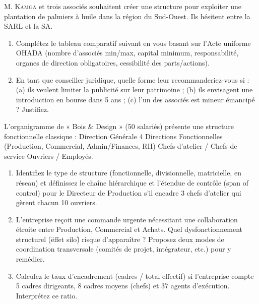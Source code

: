 \documentclass[11pt]{article}
\newcommand{\cle}[1]{{\popxbold\color{popdark}#1}}
\newcounter{popsec}
\newcounter{popsub}
\newcommand{\courssub}[1]{%
  \stepcounter{popsub}%
  \par\vspace{9pt}\noindent{\popxbold\fontsize{11.5}{13}\selectfont\color{popink}{\color{poporange}\thepopsec.\thepopsub}\hspace{6pt}#1}\par\nopagebreak\vspace{4pt}
}
\begin{document}
\courssub{Je m'entraîne}

\begin{exercice}
M. \textsc{Kamga} et trois associés souhaitent créer une structure pour exploiter une plantation de palmiers à huile dans la région du Sud-Ouest. Ils hésitent entre la SARL et la SA.
\begin{enumerate}
    \item Complétez le tableau comparatif suivant en vous basant sur l'Acte uniforme OHADA (nombre d'associés min/max, capital minimum, responsabilité, organes de direction obligatoires, cessibilité des parts/actions).
    \item En tant que conseiller juridique, quelle forme leur recommanderiez-vous si : (a) ils veulent limiter la publicité sur leur patrimoine ; (b) ils envisagent une introduction en bourse dans 5 ans ; (c) l'un des associés est mineur émancipé ? Justifiez.
\end{enumerate}
\end{exercice}

\begin{exercice}
L'organigramme de « Bois \& Design » (50 salariés) présente une structure fonctionnelle classique : Direction Générale \textrightarrow{} 4 Directions Fonctionnelles (Production, Commercial, Admin/Finances, RH) \textrightarrow{} Chefs d'atelier / Chefs de service \textrightarrow{} Ouvriers / Employés.
\begin{enumerate}
    \item Identifiez le type de structure (fonctionnelle, divisionnelle, matricielle, en réseau) et définissez le \cle{chaîne hiérarchique} et l'\cle{étendue de contrôle} (span of control) pour le Directeur de Production s'il encadre 3 chefs d'atelier qui gèrent chacun 10 ouvriers.
    \item L'entreprise reçoit une commande urgente nécessitant une collaboration étroite entre Production, Commercial et Achats. Quel dysfonctionnement structurel (\"effet silo\") risque d'apparaître ? Proposez deux modes de coordination transversale (comités de projet, intégrateur, etc.) pour y remédier.
    \item Calculez le \cle{taux d'encadrement} (cadres / total effectif) si l'entreprise compte 5 cadres dirigeants, 8 cadres moyens (chefs) et 37 agents d'exécution. Interprétez ce ratio.
\end{enumerate}
\end{exercice}
\end{document}

